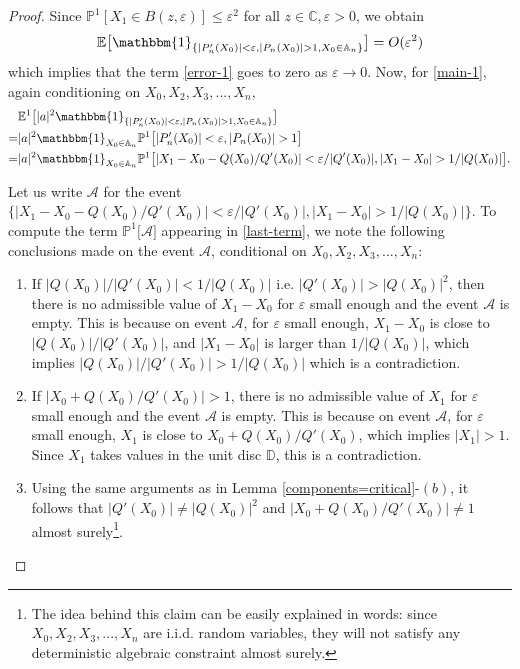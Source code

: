 \documentclass[9pt,a4paper,reqno]{amsart}
\theoremstyle{mine}
\theoremstyle{definition}
\theoremstyle{remark}
\renewcommand\epsilon{\varepsilon}
\newcommand{\mb}{\mathbb}
\begin{document}
\begin{proof}
Since $\mb{P}^1[X_1 \in B(z, \epsilon)] \leq \epsilon^2$ for all $z\in \mb{C}, \epsilon>0$, we obtain 
\[ \mb{E}\bigl[\mathbbm{1}_{\{|P_n'(X_0)|<\epsilon, |P_n(X_0)| >1, X_0 \in \mb{A}_n\}}\bigr] = O(\epsilon ^2)\]
which implies that the term \eqref{error-1} goes to zero as $\epsilon \to 0$. 
Now, for \eqref{main-1}, again conditioning on $X_0, X_2, X_3,..., X_n$, 
\begin{align}
&\mb{E}^1\bigl[|a|^2 \mathbbm{1}_{\{|P_n'(X_0)|<\epsilon,  |P_n(X_0)| >1, X_0 \in \mb{A}_n\}}\bigr] \nonumber\\ =& |a|^2 \mathbbm{1}_{X_0 \in \mb{A}_n}  \mb{P}^1\bigl[|P_n'(X_0)|<\epsilon, |P_n(X_0)| >1\bigr] \nonumber \\ =& |a|^2 \mathbbm{1}_{X_0 \in \mb{A}_n}  \mb{P}^1\bigl[ |X_1 -X_0 - Q(X_0)/Q'(X_0)| < \epsilon/|Q'(X_0)|, |X_1 - X_0| >1/|Q(X_0)|\bigr]. \label{last-term}
\end{align}

Let us write $\mathcal{A}$ for the event $\{|X_1 -X_0 - Q(X_0)/Q'(X_0)| < \epsilon/|Q'(X_0)|, |X_1 - X_0| >1/|Q(X_0)|\}$. To compute the term $\mb{P}^1\bigl[ \mathcal{A}\bigr]$ appearing in \eqref{last-term}, we note the following conclusions made on the event $\mathcal{A}$, conditional on $X_0, X_2, X_3,..., X_n$: 

\begin{enumerate}
    \item If $|Q(X_0)|/ |Q'(X_0)| < 1/ |Q(X_0)|$ i.e. $|Q'(X_0)| > |Q(X_0)|^2$, then there is no admissible value of $X_1 - X_0$ for $\epsilon$ small enough and the event $\mathcal{A}$ is empty. This is because on event $\mathcal{A}$, for $\epsilon$ small enough, $X_1 -X_0$ is close to $|Q(X_0)|/ |Q'(X_0)|$, and $|X_1 -X_0|$ is larger than $1/|Q(X_0)|$, which implies $|Q(X_0)|/ |Q'(X_0)| > 1/|Q(X_0)|$ which is a contradiction. 
\item If $|X_0 + Q(X_0)/Q'(X_0)| > 1$, there is no admissible value of $X_1$ for $\epsilon$ small enough and the event $\mathcal{A}$ is empty. This is because on event $\mathcal{A}$, for $\epsilon$ small enough, $X_1$ is close to $X_0 + Q(X_0)/Q'(X_0)$, which implies $|X_1| >1$. Since $X_1$ takes values in the unit disc $\mb{D}$, this is a contradiction. 

\item Using the same arguments as in Lemma \ref{components=critical}-$(b)$, it follows that $ |Q'(X_0)| \neq |Q(X_0)|^2$ \hspace{1mm} and $|X_0 + Q(X_0)/Q'(X_0)| \neq 1 $ almost surely\footnote{The idea behind this claim can be easily explained in words: since $X_0, X_2, X_3,..., X_n$ are i.i.d. random variables, they will not satisfy any deterministic algebraic constraint almost surely.}.


\end{enumerate}
\end{proof}
\end{document}
